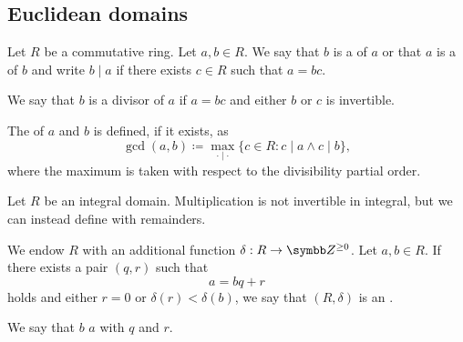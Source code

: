 \subsection{Euclidean domains}\label{subsec:euclidean_domains}

\begin{definition}\label{def:commutative_ring_division}
  Let \( R \) be a commutative ring. Let \( a, b \in R \). We say that \( b \) is a  of \( a \) or that \( a \) is a  of \( b \) and write \( b \mid a \) if there exists \( c \in R \) such that \( a = bc \).

  We say that \( b \) is a  divisor of \( a \) if \( a = bc \) and either \( b \) or \( c \) is invertible.

  The  of \( a \) and \( b \) is defined, if it exists, as
  \begin{equation*}
    \gcd(a, b) \coloneqq \max_{\cdot \mid \cdot} \{ c \in R : c \mid a \land c \mid b \},
  \end{equation*}
  where the maximum is taken with respect to the divisibility partial order.
\end{definition}

\begin{definition}\label{def:euclidean_domain}\cite{nLab:euclidean_domain}
  Let \( R \) be an integral domain. Multiplication is not invertible in integral, but we can instead define  with remainders.

  We endow \( R \) with an additional function \( \delta: R \to \Z^{\geq 0} \). Let \( a, b \in R \). If there exists a pair \( (q, r) \) such that
  \begin{equation*}
    a = bq + r
  \end{equation*}
  holds and either \( r = 0 \) or \( \delta(r) < \delta(b) \), we say that \( (R, \delta) \) is an .

  We say that \( b \)  \( a \) with  \( q \) and  \( r \).
\end{definition}

